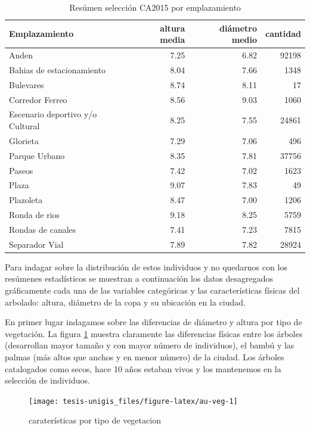 \documentclass[12pt,]{book}
\begin{document}
\begin{table}

\caption{\label{tab:ca2015sel-emplazamiento}Resúmen selección CA2015 por emplazamiento}
\centering
\begin{tabular}[t]{l|r|r|r}
\hline
Emplazamiento & altura media & diámetro medio & cantidad\\
\hline
Anden & 7.25 & 6.82 & 92198\\
\hline
Bahias de estacionamiento & 8.04 & 7.66 & 1348\\
\hline
Bulevares & 8.74 & 8.11 & 17\\
\hline
Corredor Ferreo & 8.56 & 9.03 & 1060\\
\hline
Escenario deportivo y/o Cultural & 8.25 & 7.55 & 24861\\
\hline
Glorieta & 7.29 & 7.06 & 496\\
\hline
Parque Urbano & 8.35 & 7.81 & 37756\\
\hline
Paseos & 7.42 & 7.02 & 1623\\
\hline
Plaza & 9.07 & 7.83 & 49\\
\hline
Plazoleta & 8.47 & 7.00 & 1206\\
\hline
Ronda de rios & 9.18 & 8.25 & 5759\\
\hline
Rondas de canales & 7.41 & 7.23 & 7815\\
\hline
Separador Vial & 7.89 & 7.82 & 28924\\
\hline
\end{tabular}
\end{table}

Para indagar sobre la distribución de estos individuos y no quedarnos
con los resúmenes estadísticos se muestran a continuación los datos
desagregados gráficamente cada una de las variables categóricas y las
características físicas del arbolado: altura, diámetro de la copa y su
ubicación en la ciudad.

En primer lugar indagamos sobre las diferencias de diámetro y altura por
tipo de vegetación. La figura \ref{fig:au-veg} muestra claramente las
diferencias físicas entre los árboles (desarrollan mayor tamaño y con
mayor número de individuos), el bambú y las palmas (más altos que anchos
y en menor número) de la ciudad. Los árboles catalogados como secos,
hace 10 años estaban vivos y los mantenemos en la selección de
individuos.

\begin{figure}
\texttt{[image: tesis-unigis\_files/figure-latex/au-veg-1]} \caption{caraterísticas por tipo de vegetacion}\label{fig:au-veg}
\end{figure}
\end{document}
